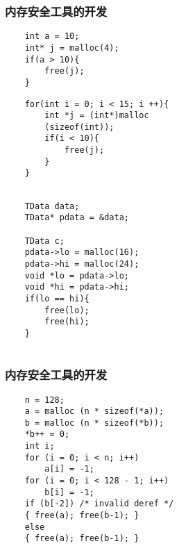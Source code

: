 \documentclass[aspectratio=1610, 13pt]{beamer}
\begin{document}
 
\begin{frame}[fragile]\frametitle{内存安全工具的开发}

\begin{multicols}{2}
 \begin{lstlisting}
    int a = 10;
    int* j = malloc(4);
    if(a > 10){
        free(j);
    }
 \end{lstlisting}
 \begin{lstlisting}
    for(int i = 0; i < 15; i ++){
        int *j = (int*)malloc
        (sizeof(int));
        if(i < 10){
            free(j);
        }
    }
 
 \end{lstlisting}
 
 \begin{lstlisting}
    TData data;
    TData* pdata = &data;

    TData c;
    pdata->lo = malloc(16);
    pdata->hi = malloc(24);
    void *lo = pdata->lo;
    void *hi = pdata->hi;
    if(lo == hi){
        free(lo);
        free(hi);
    }
 
 \end{lstlisting}
 
 
 \end{multicols}
 
 
 
\end{frame}
 
\begin{frame}[fragile]\frametitle{内存安全工具的开发}
\begin{lstlisting}
    n = 128;
    a = malloc (n * sizeof(*a));
    b = malloc (n * sizeof(*b));
    *b++ = 0;
    int i;
    for (i = 0; i < n; i++)
        a[i] = -1;
    for (i = 0; i < 128 - 1; i++)
        b[i] = -1;
    if (b[-2]) /* invalid deref */
    { free(a); free(b-1); }
    else
    { free(a); free(b-1); }

\end{lstlisting}
\end{frame}
 
\end{document}
